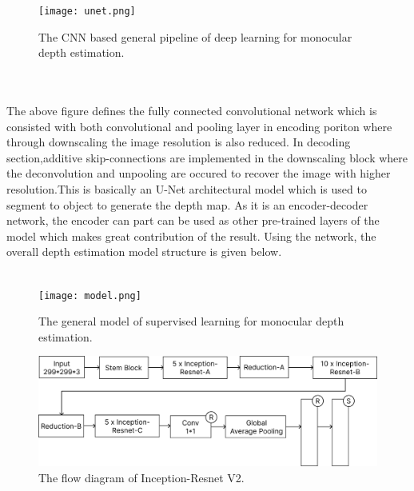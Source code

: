 \documentclass[a4paper,12pt,oneside]{book}
\begin{document}


\newpage
\begin{figure}[!hbtp]
\centering
\texttt{[image: unet.png]}
\captionsetup{font=small}
\caption{The CNN based general pipeline of deep learning for monocular depth estimation.}
\label{fig:unet}
\end{figure}
\\\\
The above figure defines the fully connected convolutional network which is consisted with both convolutional and pooling layer in encoding poriton where through downscaling the image resolution is also reduced. In decoding section,additive skip-connections are implemented in the downscaling block where the deconvolution and unpooling are occured to recover the image with higher resolution.This is basically an U-Net architectural model which is used to segment to object to generate the depth map. As it is an encoder-decoder network, the encoder can part can be used as other pre-trained layers of the model which makes great contribution of the result. Using the network, the overall depth estimation model structure is given below.
\\\\

\begin{figure}[!hbtp]
\centering
\texttt{[image: model.png]}
\captionsetup{font=small}
\vspace{5pt}
\caption{The general model of supervised learning for monocular depth estimation.}
\label{fig:model}
\end{figure}
\newpage
\begin{figure}[!hbtp]
\centering
\includegraphics[width=1\textwidth]{Figures/Irv2_workflow.png}
\captionsetup{font=small}
\vspace{10pt}
\caption{The flow diagram of Inception-Resnet V2. }
\label{fig:model}
\end{figure}
\end{document}

